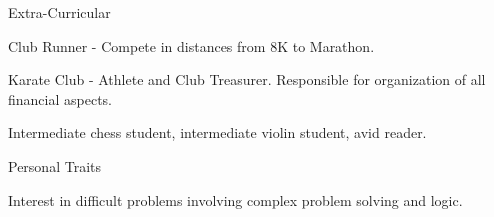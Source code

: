 \documentclass{resume} %
\begin{document}
\begin{rSection}{Extra-Curricular} \itemsep -3pt
	\item Club Runner - Compete in distances from 8K to Marathon.
	\item Karate Club - Athlete and Club Treasurer. Responsible for organization of all financial aspects.
	\item Intermediate chess student, intermediate violin student, avid reader.
\end{rSection}

\begin{rSection}{Personal Traits}
\item Interest in difficult problems involving complex problem solving and logic.
\end{rSection}
\end{document}
